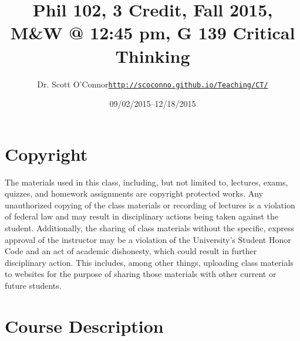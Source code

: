 \documentclass[11pt,article,oneside]{memoir}
\makeatletter
\def\myauthor{Author}
\def\mytitle{Title}
\def\mycopyright{\myauthor}
\def\myweb{\href{http://scoconno.github.io/Teaching/CT/}{http://scoconno.github.io/Teaching/CT/}}
\def\myauthor{Dr. Scott O'Connor}
\def\mytitle{{\normalsize Phil 102, 3 Credit, Fall 2015, M\&W @ 12:45 pm, G 139 \newline} \HUGE Critical Thinking}
\makeatother
\begin{document}
\setsansfont[Mapping=tex-text]{Georgia} 
\setmonofont[Mapping=tex-text,Scale=0.8]{Georgia} 

\def\ind{\hangindent=1 true cm\hangafter=1 \noindent}
\def\labelitemi{$\cdot$}

\pagestyle{kjh}

\title{\LARGE \mytitle}     
\author{\Large\myauthor \newline \footnotesize\texttt{\noindent\myweb}}
\date{09/02/2015--12/18/2015}

\published{\,}

\maketitle




%
%

\section{Copyright}
The materials used in this class, including, but not limited to, lectures, exams, quizzes, and homework assignments are copyright protected works.  Any unauthorized copying of the class materials or recording of lectures is a violation of federal law and may result in disciplinary actions being taken against the student.  Additionally, the sharing of class materials without the specific, express approval of the instructor may be a violation of the University's Student Honor Code and an act of academic dishonesty, which could result in further disciplinary action.  This includes, among other things, uploading class materials to websites for the purpose of sharing those materials with other current or future students. 

\section{Course Description}
\end{document}
